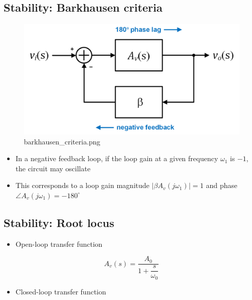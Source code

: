 \documentclass[11pt]{article}
\providecommand{\tightlist}{%
      \setlength{\itemsep}{0pt}\setlength{\parskip}{0pt}}
\begin{document}
    \hypertarget{stability-barkhausen-criteria}{%
\subsection{Stability: Barkhausen
criteria}\label{stability-barkhausen-criteria}}

    \begin{figure}
\centering
\includegraphics{barkhausen_criteria.png}
\caption{barkhausen\_criteria.png}
\end{figure}

    \begin{itemize}
\tightlist
\item
  In a negative feedback loop, if the loop gain at a given frequency
  \(\omega_1\) is \(-1\), the circuit may oscillate
\item
  This corresponds to a loop gain magnitude
  \(|\beta A_v(j\omega_1)| = 1\) and phase
  \(\angle A_v(j\omega_1) = -180^{\circ}\)
\end{itemize}

    \hypertarget{stability-root-locus}{%
\subsection{Stability: Root locus}\label{stability-root-locus}}

    \begin{itemize}
\tightlist
\item
  Open-loop transfer function
\end{itemize}

\begin{equation}
A_v(s) = \dfrac{A_0}{1+\dfrac{s}{\omega_0}}
\end{equation}

\begin{itemize}
\tightlist
\item
  Closed-loop transfer function
\end{itemize}
\end{document}
